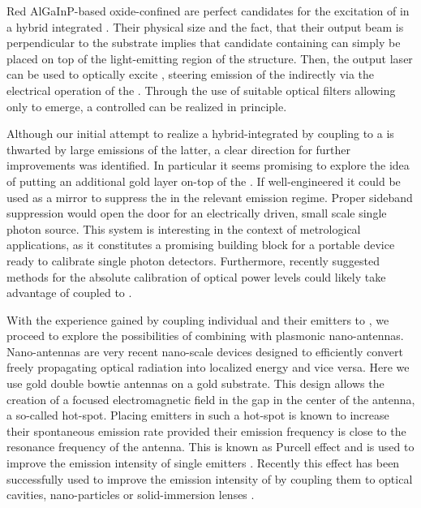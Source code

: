 
   Red AlGaInP-based oxide-confined \VCSELs are perfect candidates for the excitation of \sivs in a hybrid integrated \sps. Their physical size and the fact, that their output beam is perpendicular to the substrate implies that candidate \nds containing \sivs can simply be placed on top of the light-emitting region of the structure. Then, the \VCSELs output laser can be used to optically excite \sivs, steering emission of the \siv indirectly via the electrical operation of the \VCSEL. Through the use of suitable optical filters allowing only \siv \fl to emerge, a controlled \sps can be realized in principle.

   Although our initial attempt to realize a hybrid-integrated \sps by coupling \sivs to a \VCSEL is thwarted by large \sb emissions of the latter, a clear direction for further improvements was identified. In particular it seems promising to explore the idea of putting an additional gold layer on-top of the \VCSEL. If well-engineered it could be used as a mirror to suppress the \VCSEL \sb in the relevant \siv emission regime. Proper sideband suppression would open the door for an electrically driven, small scale single photon source. This system is interesting in the context of metrological applications, as it constitutes a promising building block for a portable device ready to calibrate single photon detectors. Furthermore, recently suggested methods for the absolute calibration of optical power levels could likely take advantage of \sivs coupled to \VCSELs \cite{Vaigu2017}.


   With the experience gained by coupling individual \nds and their emitters to \VCSELs, we proceed to explore the possibilities of combining \sivs with plasmonic nano-antennas. Nano-antennas are very recent nano-scale devices designed to efficiently convert freely propagating optical radiation into localized energy and vice versa. Here we use gold double bowtie antennas on a gold substrate. This design allows the creation of a focused electromagnetic field in the gap in the center of the antenna, a so-called hot-spot. Placing emitters in such a hot-spot is known to increase their spontaneous emission rate provided their emission frequency is close to the resonance frequency of the antenna. This is known as Purcell effect and is used to improve the emission intensity of single emitters \cite{purcell1995spontaneous}. Recently this effect has been successfully used to improve the emission intensity of \sivs by coupling them to optical cavities, nano-particles or solid-immersion lenses \cite{Riedrich-Moller2014,lee2012coupling,orlanducci2012effects,hadden2010strongly}.

